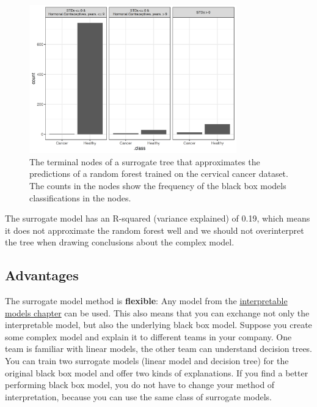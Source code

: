 \documentclass[
  10pt,
]{scrbook}
\begin{document}
\begin{figure}

{\centering \includegraphics[width=0.8\textwidth]{images/surrogate-cervical-1} 

}

\caption{The terminal nodes of a surrogate tree that approximates the predictions of a random forest trained on the cervical cancer dataset. The counts in the nodes show the frequency of the black box models classifications in the nodes.}\label{fig:surrogate-cervical}
\end{figure}

The surrogate model has an R-squared (variance explained) of 0.19, which means it does not approximate the random forest well and we should not overinterpret the tree when drawing conclusions about the complex model.

\hypertarget{advantages-10}{%
\subsection{Advantages}\label{advantages-10}}

The surrogate model method is \textbf{flexible}:
Any model from the \protect\hyperlink{simple}{interpretable models chapter} can be used.
This also means that you can exchange not only the interpretable model, but also the underlying black box model.
Suppose you create some complex model and explain it to different teams in your company.
One team is familiar with linear models, the other team can understand decision trees.
You can train two surrogate models (linear model and decision tree) for the original black box model and offer two kinds of explanations.
If you find a better performing black box model, you do not have to change your method of interpretation, because you can use the same class of surrogate models.
\end{document}
